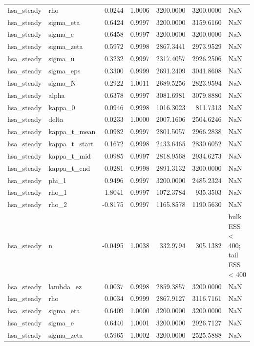 \begin{tabular}{llrrrrl}
hsa\_steady & rho & 0.0244 & 1.0006 & 3200.0000 & 3200.0000 & NaN \\
hsa\_steady & sigma\_eta & 0.6424 & 0.9997 & 3200.0000 & 3159.6160 & NaN \\
hsa\_steady & sigma\_e & 0.6458 & 0.9997 & 3200.0000 & 3200.0000 & NaN \\
hsa\_steady & sigma\_zeta & 0.5972 & 0.9998 & 2867.3441 & 2973.9529 & NaN \\
hsa\_steady & sigma\_u & 0.3232 & 0.9997 & 2317.4057 & 2926.2506 & NaN \\
hsa\_steady & sigma\_eps & 0.3300 & 0.9999 & 2691.2409 & 3041.8608 & NaN \\
hsa\_steady & sigma\_N & 0.2922 & 1.0011 & 2689.5256 & 2823.9594 & NaN \\
hsa\_steady & alpha & 0.6378 & 0.9997 & 3081.6981 & 3079.8880 & NaN \\
hsa\_steady & kappa\_0 & 0.0946 & 0.9998 & 1016.3023 & 811.7313 & NaN \\
hsa\_steady & delta & 0.0233 & 1.0000 & 2007.1606 & 2504.6246 & NaN \\
hsa\_steady & kappa\_t\_mean & 0.0982 & 0.9997 & 2801.5057 & 2966.2838 & NaN \\
hsa\_steady & kappa\_t\_start & 0.1672 & 0.9998 & 2433.6465 & 2830.6052 & NaN \\
hsa\_steady & kappa\_t\_mid & 0.0985 & 0.9997 & 2818.9568 & 2934.6273 & NaN \\
hsa\_steady & kappa\_t\_end & 0.0281 & 0.9998 & 2891.3132 & 3200.0000 & NaN \\
hsa\_steady & phi\_1 & 0.9496 & 0.9997 & 3200.0000 & 2485.2324 & NaN \\
hsa\_steady & rho\_1 & 1.8041 & 0.9997 & 1072.3784 & 935.3503 & NaN \\
hsa\_steady & rho\_2 & -0.8175 & 0.9997 & 1165.8578 & 1190.5630 & NaN \\
hsa\_steady & n & -0.0495 & 1.0038 & 332.9794 & 305.1382 & bulk ESS < 400; tail ESS < 400 \\
hsa\_steady & lambda\_ez & 0.0037 & 0.9998 & 2859.3857 & 3200.0000 & NaN \\
hsa\_steady & rho & 0.0034 & 0.9999 & 2867.9127 & 3116.7161 & NaN \\
hsa\_steady & sigma\_eta & 0.6409 & 1.0000 & 3200.0000 & 3200.0000 & NaN \\
hsa\_steady & sigma\_e & 0.6440 & 1.0001 & 3200.0000 & 2926.7127 & NaN \\
hsa\_steady & sigma\_zeta & 0.5965 & 1.0002 & 3200.0000 & 2525.5888 & NaN \\

\end{tabular}
